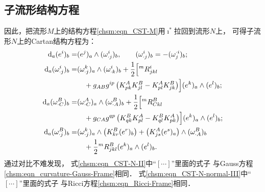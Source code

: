 \subsection{子流形结构方程}
因此，把流形$M$上的结构方程\eqref{chsm:eqn_CST-M}用$\imath^*$拉回到流形$N$上，
可得子流形$N$上的Cartan结构方程为：
\begin{subequations}\label{chsm:eqn_CST-N-Nb}
    \begin{align}
        {\rm d}_a (e^i)_b =& (e^j)_a \wedge (\omega _{\cdot j}^i)_b ,
        \qquad (\omega _{\cdot j}^i)_b =-(\omega _{j}^{\cdot i})_b ; \label{chsm:eqn_CST-N-I} \\
        {\rm d}_a ( \omega _{\cdot j} ^i  )_b  =&  ( \omega _{\cdot j}^k )_a  \wedge ( \omega _{\cdot k}^i )_b
        + \frac{1}{2}\Bigl[{}^{m}R_{jkl}^i    \notag \\
        &\quad + g_{A B} g^{ip}
        \left(K_{pk}^A K^{B}_{jl} -  K_{pl}^A K^{B}_{jk}\right) \Bigr]
        (e^k)_a \wedge (e^l)_b ; \label{chsm:eqn_CST-N-II} \\
        {\rm d}_a ( \omega _{\cdot C} ^B  )_b  =&
        ( \omega _{\cdot C}^A )_a  \wedge ( \omega _{\cdot A}^B )_b 
        + \frac{1}{2}\Bigl[ {}^{m}R_{C kl}^B  \notag\\
        &\quad  +g_{C A} g^{qp}
        \left(  K^{B}_{qk} K_{pl}^A - K^{B}_{ql} K_{pk}^A  \right)  \Bigr]
        (e^k)_a \wedge (e^l)_b ;  \label{chsm:eqn_CST-N-normal-III}  \\
        {\rm d}_a ( \omega _{\cdot j} ^B  )_b  =&
        ( \omega _{\cdot j}^k )_a \wedge \bigl(K^{B}_{kr}(e^r)_b\bigr)
        + \bigl(K^{A}_{js}(e^s)_a\bigr)  \wedge ( \omega _{\cdot A}^B )_b \notag \\
        &\quad  + \frac{1}{2}{}^{m}R_{ jkl}^B  (e^k)_a \wedge (e^l)_b  . \label{chsm:eqn_CST-N-normal-IV}
    \end{align}
\end{subequations} %
通过对比不难发现，
式\eqref{chsm:eqn_CST-N-II}中“$[\cdots]$”里面的式子
与Gauss方程\eqref{chsm:eqn_curvature-Gauss-Frame}相同．
式\eqref{chsm:eqn_CST-N-normal-III}中“$[\cdots]$”里面的式子
与Ricci方程\eqref{chsm:eqn_Ricci-Frame}相同．
%

